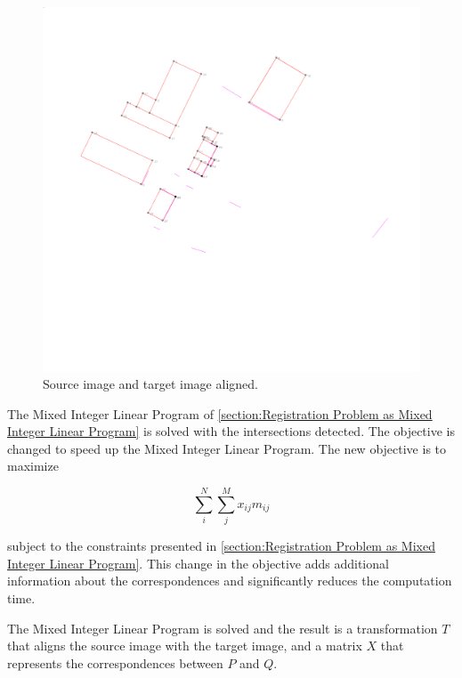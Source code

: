             \begin{figure}[H]
                \includegraphics[width=\textwidth]{images/solution_images/2D_XY_alignment_inverted.png}
                \caption{Source image and target image aligned.}
                \label{fig:2D_aligned}
            \end{figure}

            The Mixed Integer Linear Program of \autoref{section:Registration Problem as Mixed Integer Linear Program} is solved with the intersections detected.
            The objective is changed to speed up the Mixed Integer Linear Program. The new objective is to maximize

            \begin{equation}
                \label{eq:objective_angles}
                \sum_{i}^{N} \sum_{j}^{M} x_{ij} m_{ij} 
            \end{equation}    

            subject to the constraints presented in \autoref{section:Registration Problem as Mixed Integer Linear Program}.
            This change in the objective adds additional information about the correspondences and significantly reduces the computation time.

            The Mixed Integer Linear Program is solved and the result is a transformation $T$ that aligns the source image with the target image,
            and a matrix $X$ that represents the correspondences between $P$ and $Q$.

